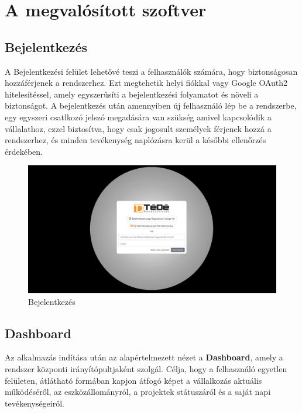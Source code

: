 \section{A megvalósított szoftver}
\subsection{Bejelentkezés}
A Bejelentkezési felület lehetővé teszi a felhasználók számára, hogy biztonságosan hozzáférjenek a rendszerhez.
Ezt megtehetik helyi fiókkal vagy Google OAuth2 hitelesítéssel, amely egyszerűsíti a bejelentkezési folyamatot és növeli a biztonságot.
A bejelentkezés után amennyiben új felhasználó lép be a rendszerbe, egy egyszeri csatlkozó jelszó megadására van szükség amivel kapcsolódik a vállalathoz,
ezzel biztosítva, hogy csak jogosult személyek férjenek hozzá a rendszerhez, és minden tevékenység naplózásra kerül a későbbi ellenőrzés érdekében.
\begin{figure}[H]
	\centering
    \includegraphics[width=150mm, keepaspectratio]{figures/login.jpg}
    \caption{Bejelentkezés}
    \label{fig:login}
\end{figure}
\subsection{Dashboard}

Az alkalmazás indítása után az alapértelmezett nézet a \textbf{Dashboard}, amely a rendszer központi irányítópultjaként szolgál.  
Célja, hogy a felhasználó egyetlen felületen, átlátható formában kapjon átfogó képet a vállalkozás aktuális működéséről, 
az eszközállományról, a projektek státuszáról és a saját napi tevékenységeiről.


